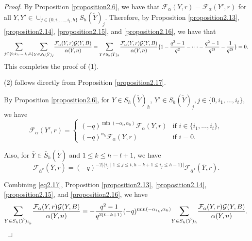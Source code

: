 \documentclass[11pt,oneside]{amsart}
\theoremstyle{plain}
\theoremstyle{definition}
\theoremstyle{remark}
\newcommand{\tx}[1]{\text{#1}}
\newcommand{\CF}{{\mathcal F}}
\newcommand{\CG}{{\mathcal G}}
\numberwithin{equation}{section}
\begin{document}
	\begin{proof} By Proposition \ref{proposition2.6}, we have that $\CF_{\alpha}(Y,r)=\CF_{\alpha}(Y',r)$ for all $Y, Y' \in \cup_{j \in \lbrace 0,i_1,\dots,i_t,h\rbrace } S_{h}(\widetilde{Y})_j$. Therefore, by Proposition \ref{proposition2.13}, \ref{proposition2.14}, \ref{proposition2.15}, and \ref{proposition2.16}, we have that
		\begin{equation*}
			\mathlarger{\sum}_{j \in \lbrace 0,i_1,\dots,i_t,h \rbrace}\mathlarger{\sum}_{Y \in S_h(\widetilde{Y})_{j}}	\dfrac{\CF_{\alpha}(Y,r)\CG(Y,B)}{\alpha(Y,n)}=\mathlarger{\sum}_{Y \in S_h(\widetilde{Y})_{h}}	\dfrac{\CF_{\alpha}(Y,r)\CG(Y,B)}{\alpha(Y,n)}\lbrace 1-\frac{q^2-1}{q^2}-\dots-\frac{q^2-1}{q^{2t}}-\frac{1}{q^{2t}}\rbrace=0.
		\end{equation*}
		This completes the proof of (1).
		
		(2) follows directly from Proposition \ref{proposition2.17}.
		
		By Proposition \ref{proposition2.6}, for $Y \in S_{h}(\widetilde{Y})_h$, $Y' \in S_{h}(\widetilde{Y})_{j}, j \in \lbrace 0,i_1,\dots,i_t \rbrace$, we have
		\begin{equation}\label{eq2.17}
			\CF_{\alpha}(Y',r)=\left\lbrace \begin{array}{ll}(-q)^{\min(-\alpha_i,\alpha_h)}\CF_{\alpha}(Y,r) & \tx{if }i \in \lbrace i_1,\dots,i_t\rbrace,\\
				(-q)^{\alpha_h}\CF_{\alpha}(Y,r) & \tx{if }i=0.
			\end{array}\right.
		\end{equation}
		
		Also, for $\overline{Y} \in \overline{S}_h(\widetilde{Y})$ and $1 \leq k \leq h-l+1$, we have
		\begin{equation}\label{eq2.18}
			\CF_{\overline{\alpha}^{k}}(\overline{Y},r)=(-q)^{-2\vert \lbrace i_j \mid 1 \leq j\leq t, h-k+1 \leq i_j \leq h-1 \rbrace \vert}\CF_{\overline{\alpha}^1}(\overline{Y},r).
		\end{equation}
		
		Combining \eqref{eq2.17}, Proposition \ref{proposition2.13}, \ref{proposition2.14}, \ref{proposition2.15}, and \ref{proposition2.16}, we have
		\begin{equation}\label{eq2.19}
			\mathlarger{\sum}_{Y \in S_h(\widetilde{Y})_{i_k}}	\dfrac{\CF_{\alpha}(Y,r)\CG(Y,B)}{\alpha(Y,n)}=-\dfrac{q^2-1}{q^{2(t-k+1)}}(-q)^{\min(-\alpha_{i_k},\alpha_h)}\mathlarger{\sum}_{Y \in S_h(\widetilde{Y})_{h}}	\dfrac{\CF_{\alpha}(Y,r)\CG(Y,B)}{\alpha(Y,n)}.
		\end{equation}
		

\end{proof}
\end{document}
